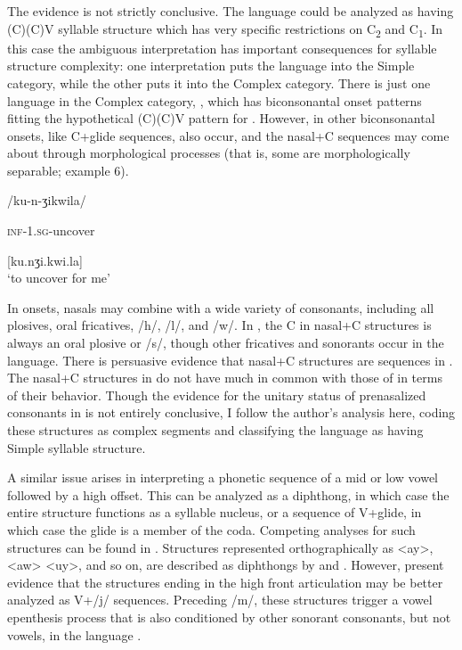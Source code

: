   The  evidence is not strictly conclusive. The language could be analyzed as having (C)(C)V syllable structure which has very specific restrictions on C\textsubscript{2} and C\textsubscript{1}. In this case the ambiguous interpretation has important consequences for syllable structure complexity: one interpretation puts the language into the Simple category, while the other puts it into the Complex category. There is just one language in the Complex category, , which has biconsonantal onset patterns fitting the hypothetical (C)(C)V pattern for . However, in  other biconsonantal onsets, like C+glide sequences, also occur, and the nasal+C sequences may come about through morphological processes (that is, some are morphologically separable; example 6).

\ea\label{ex:4.6}

/ku-n-ʒikwila/

\textsc{inf}-\textsc{1.sg}-uncover

[ku.nʒi.kwi.la]\\
\glt ‘to uncover for me’
\citep[24]{Kawasha2003}
\z

In  onsets, nasals may combine with a wide variety of consonants, including all plosives, oral fricatives, /h/, /l/, and /w/. In , the C in nasal+C structures is always an oral plosive or /s/, though other fricatives and sonorants occur in the language. There is persuasive evidence that nasal+C structures are sequences in . The nasal+C structures in  do not have much in common with those of  in terms of their behavior. Though the evidence for the unitary status of prenasalized consonants in  is not entirely conclusive, I follow the author’s analysis here, coding these structures as complex segments and classifying the language as having Simple syllable structure. 

  A similar issue arises in interpreting a phonetic sequence of a mid or low vowel followed by a high offset. This can be analyzed as a diphthong, in which case the entire structure functions as a syllable nucleus, or a sequence of V+glide, in which case the glide is a member of the coda. Competing analyses for such structures can be found in . Structures represented orthographically as <ay>, <aw> <uy>, and so on, are described as diphthongs by \citet{Jansen2010} and \citet{RigsbyRude1996}. However, \citet{HargusBeavert2006} present evidence that the structures ending in the high front articulation may be better analyzed as V+/j/ sequences. Preceding /m/, these structures trigger a vowel epenthesis process that is also conditioned by other sonorant consonants, but not vowels, in the language .

